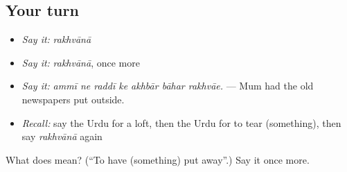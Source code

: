 \subsection*{Your turn}
\begin{itemize}
\raggedright
  \item \emph{Say it:} \emph{rakhvānā}
  \item \emph{Say it:} \emph{rakhvānā}, once more
  \item \emph{Say it:} \emph{ammī ne raddī ke akhbār bāhar rakhvāe.} — Mum had the old newspapers put outside.
  \item \emph{Recall:} say the Urdu for a loft, then the Urdu for to tear (something), then say \emph{rakhvānā} again
\end{itemize}

\begin{tcolorbox}[breakable,colback=teal!4,colframe=teal!35!black,title={Before you move on}]
What does  mean? (\textquotedblleft{}To have (something) put away\textquotedblright{}.) Say it once more.
\end{tcolorbox}
